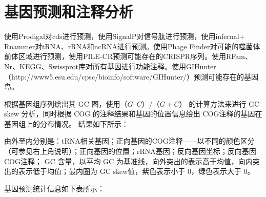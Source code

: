 \section{基因预测和注释分析}
使用Prodigal\cite{Prodigal}对cds进行预测，使用SignalP对信号肽进行预测，使用infernal\cite{Infernal}$+$Rnammer\cite{RNAmmer}对tRNA、rRNA和ncRNA进行预测。使用Phage Finder\cite{Phage_Finder}对可能的噬菌体前体区域进行预测，使用PILE-CR\cite{PILER-CR}预测可能存在的CRISPR序列。使用RFam\cite{Rfam}、Nr\cite{Nr}、KEGG\cite{KEGG}、Swissprot\cite{SWISS}库对所有基因进行功能注释。使用GIHunter（http://www5.esu.edu/cpsc/bioinfo/software/GIHunter/）预测可能存在的基因岛。

根据基因组序列绘出其 GC 图，使用$（ G–C） /（ G+ C）$ 的计算方法来进行 GC skew 分析，同时根据 COG \cite{eggNOG}的注释结果和基因的位置信息绘出 COG注释的基因在基因组上的分布情况。
结果如下所示：




由外至内分别是：tRNA相关基因；正向基因的COG注释——以不同的颜色区分（可参见右上角说明）；正向基因的位置；rRNA基因；反向基因坐标；反向基因COG注释； GC 含量，以平均 GC 为基准线，向外突出的表示高于均值，向内突出的表示低于均值；最内圈为 GC skew值，紫色表示小于 0，绿色表示大于 0。


基因预测统计信息如下表所示：






